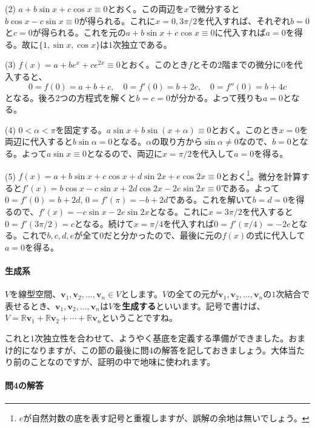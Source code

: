 \noindent (2) $a + b\sin x + c \cos x \equiv 0$とおく。この両辺を$x$で微分すると$b\cos x - c\sin x \equiv 0$が得られる。これに$x = 0, 3\pi/2$を代入すれば、それぞれ$b = 0$と$c = 0$が得られる。これを元の$a + b\sin x + c \cos x \equiv 0$に代入すれば$a = 0$を得る。故に$\{1, \sin x, \cos x\}$は$1$次独立である。

\noindent (3) $f(x) = a + be^x + ce^{2x} \equiv 0$とおく。このとき$f$とその$2$階までの微分に$0$を代入すると、
\[
0 = f(0) = a + b + c,\quad 0 = f'(0) = b + 2c,\quad 0 = f''(0) = b + 4c
\]
となる。後ろ$2$つの方程式を解くと$b = c = 0$が分かる。よって残りも$a = 0$となる。

\noindent (4) $0 < \alpha < \pi$を固定する。$a \sin x + b \sin(x + \alpha) \equiv 0$とおく。このとき$x = 0$を両辺に代入すると$b\sin\alpha = 0$となる。$\alpha$の取り方から$\sin\alpha\neq 0$なので、$b = 0$となる。よって$a\sin x \equiv 0$となるので、両辺に$x = \pi/2$を代入して$a = 0$を得る。

\noindent (5) $f(x) = a + b\sin x + c \cos x + d\sin 2x + e\cos 2x \equiv 0$とおく\footnote{$e$が自然対数の底を表す記号と重複しますが、誤解の余地は無いでしょう。}。微分を計算すると$f'(x) = b\cos x - c\sin x + 2d\cos 2x -2e\sin 2x \equiv 0$である。よって$0 = f'(0) = b + 2d$, $0  = f'(\pi) = -b + 2d$である。これを解いて$b = d = 0$を得るので、$f'(x) = -c\sin x - 2e\sin 2x$となる。これに$x = 3\pi/2$を代入すると$0 = f'(3\pi/2) = c$となる。続けて$x = \pi/4$を代入すれば$0 = f'(\pi/4) = -2e$となる。これで$b, c, d, e$が全て$0$だと分かったので、最後に元の$f(x)$の式に代入して$a = 0$を得る。

\paragraph{生成系}

$V$を線型空間、$\bm{v}_1, \bm{v}_2, \ldots, \bm{v}_n\in V$とします。$V$の全ての元が$\bm{v}_1, \bm{v}_2, \ldots, \bm{v}_n$の$1$次結合で表せるとき、$\bm{v}_1, \bm{v}_2, \ldots, \bm{v}_n$は$V$を\textbf{生成する}といいます。記号で書けば、$V = \mathbb{R}\bm{v}_1 + \mathbb{R}\bm{v}_2 + \cdots + \mathbb{R}\bm{v}_n$ということですね。

これと$1$次独立性を合わせて、ようやく基底を定義する準備ができました。おまけ的になりますが、この節の最後に問4の解答を記しておきましょう。大体当たり前のことなのですが、証明の中で地味に使われます。

\paragraph{問4の解答}

